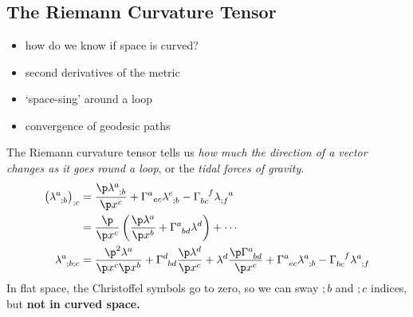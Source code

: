 \documentclass[a4paper, 11pt, normalem]{report}
\begin{document}
\chapter{}
\section{The Riemann Curvature Tensor}
\begin{itemize}
    \item how do we know if space is curved?
    \item second derivatives of the metric
    \item `space-sing' around a loop
    \item convergence of geodesic paths
\end{itemize}
The Riemann curvature tensor tells us \emph{how much the direction of a vector changes as it goes round a loop}, or the \emph{tidal forces of gravity}.
\begin{align}
    \tensor{\left(\tensor{\lambda}{^a_{;b}}\right)}{_{;c}} &= \frac{\p\tensor{\lambda}{^a_{;b}}}{\p x^c} + \tensor{\Gamma}{^a}{_{ec}}\tensor{\lambda}{^e_{;b}} - \tensor{\Gamma}{_{bc}^f}\tensor{\lambda}{_{;f}^a} \\
                                                         &= \frac{\p}{\p x^c}\left(\frac{\p\lambda^a}{\p x^b} + \tensor{\Gamma}{^a_{bd}}\lambda^d\right) + \cdots \\
    \tensor{\lambda}{^a_{;b;c}} &= \frac{\p^2\lambda^a}{\p x^c \p x^b} + \tensor{\Gamma}{^d_{bd}}\frac{\p\lambda^d}{\p x^c} + \lambda^d\frac{\p\tensor{\Gamma}{^a_{bd}}}{\p x^c} + \tensor{\Gamma}{^a_{ec}}\tensor{\lambda}{^a_{;b}}-\tensor{\Gamma}{_{bc}^f}\tensor{\lambda}{^a_{;f}} 
\end{align}
In flat space, the Christoffel symbols go to zero, so we can sway $;b$ and $;c$ indices, but \textbf{not in curved space.}
\end{document}
